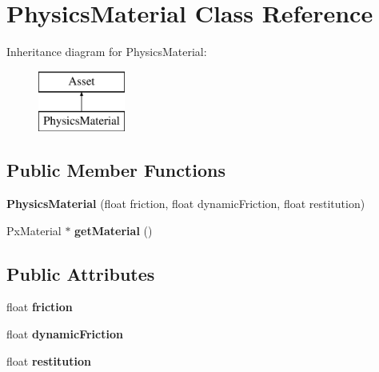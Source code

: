 \hypertarget{class_physics_material}{}\section{Physics\+Material Class Reference}
\label{class_physics_material}
Inheritance diagram for Physics\+Material\+:\begin{figure}[H]
\begin{center}
\leavevmode
\includegraphics[height=2.000000cm]{class_physics_material}
\end{center}
\end{figure}
\subsection*{Public Member Functions}
\begin{DoxyCompactItemize}
\item 
\hypertarget{class_physics_material_ad7ba381e5ff323b9377ab562fada3425}{}{\bfseries Physics\+Material} (float friction, float dynamic\+Friction, float restitution)\label{class_physics_material_ad7ba381e5ff323b9377ab562fada3425}

\item 
\hypertarget{class_physics_material_a36ecb77c53c3ef3e52c6f867be156f96}{}Px\+Material $\ast$ {\bfseries get\+Material} ()\label{class_physics_material_a36ecb77c53c3ef3e52c6f867be156f96}

\end{DoxyCompactItemize}
\subsection*{Public Attributes}
\begin{DoxyCompactItemize}
\item 
\hypertarget{class_physics_material_a40499e7e0af0b5a17c412b23bb6d98a4}{}float {\bfseries friction}\label{class_physics_material_a40499e7e0af0b5a17c412b23bb6d98a4}

\item 
\hypertarget{class_physics_material_a6ede2c7f6bdaef3a2ee60667a6e6a546}{}float {\bfseries dynamic\+Friction}\label{class_physics_material_a6ede2c7f6bdaef3a2ee60667a6e6a546}

\item 
\hypertarget{class_physics_material_acf45501fe93570bfb0ea3365941e19c5}{}float {\bfseries restitution}\label{class_physics_material_acf45501fe93570bfb0ea3365941e19c5}

\end{DoxyCompactItemize}


